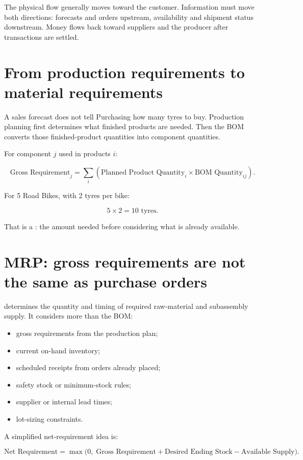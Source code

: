 The physical flow generally moves toward the customer. Information must move both directions: forecasts and orders upstream, availability and shipment status downstream. Money flows back toward suppliers and the producer after transactions are settled.

\section{From production requirements to material requirements}

A sales forecast does not tell Purchasing how many tyres to buy. Production planning first determines what finished products are needed. Then the BOM converts those finished-product quantities into component quantities.

For component $j$ used in products $i$:

\[
\text{Gross Requirement}_j
= \sum_i \left(\text{Planned Product Quantity}_i\times \text{BOM Quantity}_{ij}\right).
\]

For 5 Road Bikes, with 2 tyres per bike:

\[
5\times 2=10\text{ tyres}.
\]

That is a : the amount needed before considering what is already available.

\section{MRP: gross requirements are not the same as purchase orders}

 determines the quantity and timing of required raw-material and subassembly supply. It considers more than the BOM:

\begin{itemize}
  \item gross requirements from the production plan;
  \item current on-hand inventory;
  \item scheduled receipts from orders already placed;
  \item safety stock or minimum-stock rules;
  \item supplier or internal lead times;
  \item lot-sizing constraints.
\end{itemize}

A simplified net-requirement idea is:

\[
\text{Net Requirement}
= \max\bigl(0,\;\text{Gross Requirement}+\text{Desired Ending Stock}-\text{Available Supply}\bigr).
\]

